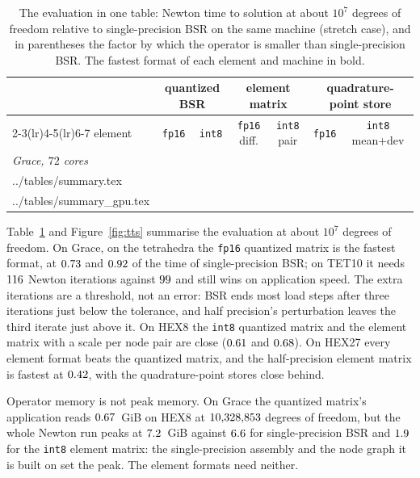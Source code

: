 \documentclass[sigconf,review]{acmart}
\makeatletter
\newcommand{\rows}[1]{\@@input #1 }
\makeatother
\begin{document}
\begin{table}[t]
\centering
\small
\begin{tabular}{lcccccc}
\toprule
 & \multicolumn{2}{c}{quantized BSR} & \multicolumn{2}{c}{element matrix} & \multicolumn{2}{c}{quadrature-point store} \\
\cmidrule(lr){2-3}\cmidrule(lr){4-5}\cmidrule(lr){6-7}
element & \texttt{fp16} & \texttt{int8} & \texttt{fp16} diff. & \texttt{int8} pair & \texttt{fp16} & \texttt{int8} mean+dev \\
\midrule
\multicolumn{7}{l}{\emph{Grace, $72$ cores}} \\
\rows{../tables/summary.tex}
\midrule
\multicolumn{7}{l}{\emph{H100}} \\
\rows{../tables/summary_gpu.tex}
\bottomrule
\end{tabular}
\caption{The evaluation in one table: Newton time to solution at about $10^7$ degrees of freedom
relative to single-precision BSR on the same machine (stretch case), and in parentheses the factor by
which the operator is smaller than single-precision BSR.  The fastest format of each element and
machine in bold.}
\label{tab:summary}
\end{table}

Table~\ref{tab:summary} and Figure~\ref{fig:tts} summarise the evaluation at about $10^7$ degrees of
freedom.  On Grace, on the tetrahedra the \texttt{fp16} quantized matrix is the fastest format, at
$0.73$ and $0.92$ of the time of single-precision BSR; on TET10 it needs
$116$ Newton iterations against $99$ and still wins on
application speed.  The extra iterations are a threshold, not an error: BSR ends most load steps
after three iterations just below the tolerance, and half precision's perturbation leaves the third
iterate just above it.  On HEX8 the \texttt{int8} quantized matrix and the element matrix with a scale per
node pair are close ($0.61$ and $0.68$).  On HEX27 every element
format beats the quantized matrix, and the half-precision element matrix is fastest at
$0.42$, with the quadrature-point stores close behind.

Operator memory is not peak memory.  On Grace the quantized matrix's application reads
$0.67$~GiB on HEX8 at $10{,}328{,}853$ degrees of freedom, but the whole Newton
run peaks at $7.2$~GiB against $6.6$ for single-precision BSR
and $1.9$ for the \texttt{int8} element matrix: the single-precision assembly and
the node graph it is built on set the peak.  The element formats need neither.
\end{document}
